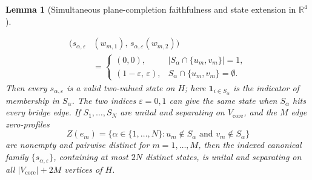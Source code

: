 \documentclass[
  aps,
  pra,
  reprint,
  superscriptaddress,
  amsmath,
  amssymb,
  nofootinbib,
  floatfix
]{revtex4-2}
\newtheorem{lemma}[theorem]{Lemma}
\theoremstyle{definition}
\theoremstyle{remark}
\newcommand{\R}{\mathbb{R}}
\begin{document}
\begin{lemma}[Simultaneous plane-completion faithfulness and state extension in $\R^4$]
\begin{enumerate}
\begin{equation}\label{eq:canonical-states}
\begin{aligned}
\bigl(s_{\alpha,\varepsilon}&(w_{m,1}),\,s_{\alpha,\varepsilon}(w_{m,2})\bigr)\\
&=\begin{cases}
(0,0), & |S_\alpha\cap\{u_m,v_m\}|=1,\\
(1-\varepsilon,\,\varepsilon), & S_\alpha\cap\{u_m,v_m\}=\emptyset.
\end{cases}
\end{aligned}
\end{equation}
Then every $s_{\alpha,\varepsilon}$ is a valid two-valued state on $H$; here $\mathbf{1}_{i\in S_\alpha}$ is the indicator of membership in $S_\alpha$. The two indices $\varepsilon=0,1$ can give the same state when $S_\alpha$ hits every bridge edge. If $S_1,\ldots,S_N$ are unital and separating on $V_{\mathrm{core}}$, and the $M$ edge zero-profiles
\begin{equation}\label{eq:zero-profiles}
Z(e_m) = \bigl\{\alpha\in\{1,\ldots,N\} : u_m\notin S_\alpha\text{ and }v_m\notin S_\alpha\bigr\}
\end{equation}
are nonempty and pairwise distinct for $m=1,\ldots,M$, then the indexed canonical family $\{s_{\alpha,\varepsilon}\}$, containing at most $2N$ distinct states, is unital and separating on all $|V_{\mathrm{core}}|+2M$ vertices of $H$.
\end{enumerate}
\end{lemma}
\end{document}
